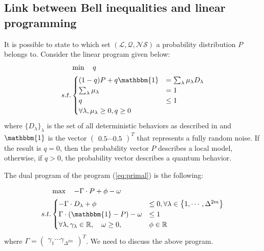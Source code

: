 \documentclass[12pt]{article}
\renewcommand{\L}{\mathcal{L}}
\newcommand{\NS}{\mathcal{NS}}
\newcommand{\Q}{\mathcal{Q}}
\begin{document}
\begin{multicols}{2}

\section*{Link between Bell inequalities and linear programming}
It is possible to state to which set $( \L, \Q, \NS )$ a probability distribution $P$ belongs to.
Consider the linear program given below:
\begin{equation} \label{eq:primal}
	\begin{aligned}
			 & \min \quad q \\
		s.t. &
		\begin{cases}
			(1-q) P + q \mathbbm{1}  & = \sum_\lambda \mu_\lambda D_\lambda \\
			\sum_\lambda \mu_\lambda & = 1 \\
			q & \leq 1 \\
			\forall \lambda, \mu_\lambda \geq 0, q \geq 0
		\end{cases}
	\end{aligned}
\end{equation}
where $\{D_\lambda\}_\lambda$ is the set of all deterministic behaviors as
described in \cite{2014-bell-nonlocality} and $\mathbbm{1}$ is the vector
$\begin{pmatrix} 0.5 \cdots 0.5 \end{pmatrix}^T$ that represents a fully random
noise. If the result is $q = 0$, then the probability vector $P$ describes a
local model, otherwise, if $q > 0$, the probability vector describes a quantum
behavior.

The dual program of the program (\ref{eq:primal}) is the following:

\begin{equation} \label{eq:dual}
	\begin{aligned}
 			 & \max \quad -\Gamma \cdot P + \phi - \omega \\
		s.t. &
		\begin{cases}
			- \Gamma \cdot D_\lambda + \phi & \leq 0, \forall \lambda \in \big\{1, \cdots, \Delta^{2m}\big\} \\
			\Gamma \cdot (\mathbbm{1} - P) - \omega & \leq 1 \\
			\forall \lambda, \gamma_\lambda \in \mathbb{R}, \quad \omega \geq 0,  & \phi \in \mathbb{R}
		\end{cases}
	\end{aligned}
\end{equation}
where $\Gamma = \begin{pmatrix} \gamma_1 \cdots \gamma_{\Delta^{2m}}
\end{pmatrix}^T$. We need to discuss the above program.


\end{multicols}
\end{document}
